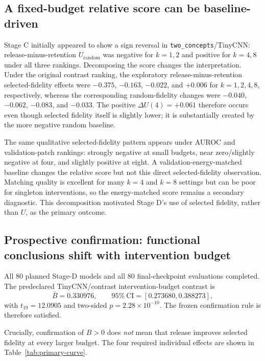 \documentclass[10pt]{article}
\begin{document}
\subsection{A fixed-budget relative score can be baseline-driven}\label{sec:decomposition}

Stage C initially appeared to show a sign reversal in \texttt{two\_concepts}/TinyCNN: release-minus-retention $U_{\mathrm{random}}$ was negative for $k=1,2$ and positive for $k=4,8$ under all three rankings. Decomposing the score changes the interpretation. Under the original contrast ranking, the exploratory release-minus-retention selected-fidelity effects were $-0.375$, $-0.163$, $-0.022$, and $+0.006$ for $k=1,2,4,8$, respectively, whereas the corresponding random-fidelity changes were $-0.040$, $-0.062$, $-0.083$, and $-0.033$. The positive $\Delta U(4)=+0.061$ therefore occurs even though selected fidelity itself is slightly lower; it is substantially created by the more negative random baseline.

The same qualitative selected-fidelity pattern appears under AUROC and validation-patch rankings: strongly negative at small budgets, near zero/slightly negative at four, and slightly positive at eight. A validation-energy-matched baseline changes the relative score but not this direct selected-fidelity observation. Matching quality is excellent for many $k=4$ and $k=8$ settings but can be poor for singleton interventions, so the energy-matched score remains a secondary diagnostic. This decomposition motivated Stage D's use of selected fidelity, rather than $U$, as the primary outcome.

\subsection{Prospective confirmation: functional conclusions shift with intervention budget}\label{sec:confirmation}

All 80 planned Stage-D models and all 80 final-checkpoint evaluations completed. The predeclared TinyCNN/contrast intervention-budget contrast is
\[
\bar B=0.330976,\qquad
95\%\ \mathrm{CI}=[0.273680,0.388273],
\]
with $t_{19}=12.0905$ and two-sided $p=2.28\times10^{-10}$. The frozen confirmation rule is therefore satisfied.

Crucially, confirmation of $B>0$ does \emph{not} mean that release improves selected fidelity at every larger budget. The four required individual effects are shown in Table~\ref{tab:primary-curve}.
\end{document}
